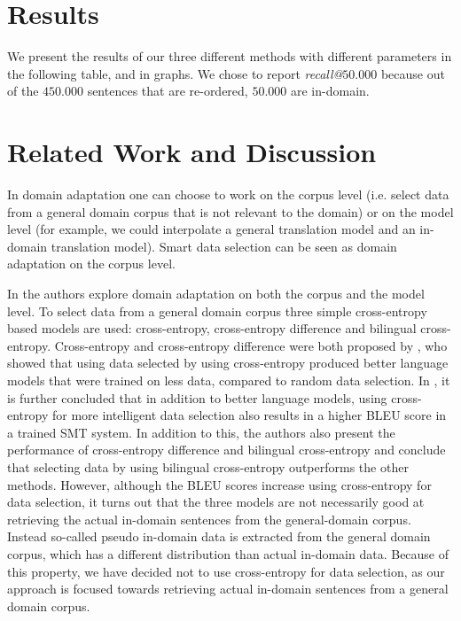 \documentclass[11pt]{article}
\begin{document}
\section{Results}
\label{sec:results}
We present the results of our three different methods with different parameters in the following table, and in graphs. We chose to report \textit{recall@}$50.000$ because out of the $450.000$ sentences that are re-ordered, $50.000$ are in-domain. 


\section{Related Work and Discussion}
\label{sec:related}
In domain adaptation one can choose to work on the corpus level (i.e. select data from a general domain corpus that is not relevant to the domain) or on the model level (for example, we could interpolate a general translation model and an in-domain translation model). Smart data selection can be seen as domain adaptation on the corpus level. 

In \cite{pseudo} the authors explore domain adaptation on both the corpus and the model level. To select data from a general domain corpus three simple cross-entropy based models are used: cross-entropy, cross-entropy difference and bilingual cross-entropy. Cross-entropy and cross-entropy difference were both proposed by \cite{intelligent}, who showed that using data selected by using cross-entropy produced better language models that were trained on less data, compared to random data selection. In \cite{pseudo}, it is further concluded that in addition to better language models, using cross-entropy for more intelligent data selection also results in a higher BLEU score in a trained SMT system. In addition to this, the authors also present the performance of cross-entropy difference and bilingual cross-entropy and conclude that selecting data by using bilingual cross-entropy outperforms the other methods. However, although the BLEU scores increase using cross-entropy for data selection, it turns out that the three models are not necessarily good at retrieving the actual in-domain sentences from the general-domain corpus. Instead so-called pseudo in-domain data is extracted from the general domain corpus, which has a different distribution than actual in-domain data. Because of this property, we have decided not to use cross-entropy for data selection, as our approach is focused towards retrieving actual in-domain sentences from a general domain corpus.
\end{document}
